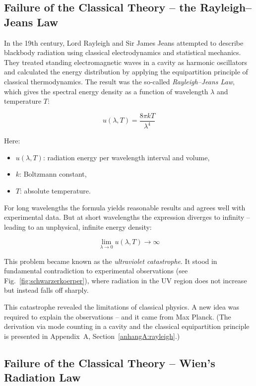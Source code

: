 \subsection{Failure of the Classical Theory – \newline the Rayleigh–Jeans Law}

In the 19th century, Lord Rayleigh and Sir James Jeans attempted to describe blackbody radiation using classical electrodynamics and statistical mechanics. They treated standing electromagnetic waves in a cavity as harmonic oscillators and calculated the energy distribution by applying the equipartition principle of classical thermodynamics.
\newpage
\noindent
The result was the so-called \emph{Rayleigh–Jeans Law}, which gives the spectral energy density as a function of wavelength \( \lambda \) and temperature \( T \):

\[
u(\lambda, T) = \frac{8 \pi k T}{\lambda^4}
\]

Here:
\begin{itemize}
	\item \( u(\lambda, T) \): radiation energy per wavelength interval and volume,
	\item \( k \): Boltzmann constant,
	\item \( T \): absolute temperature.
\end{itemize}

For long wavelengths the formula yields reasonable results and agrees well with experimental data. But at short wavelengths the expression diverges to infinity – leading to an unphysical, infinite energy density:

\[
\lim_{\lambda \to 0} u(\lambda, T) \to \infty
\]

This problem became known as the \emph{ultraviolet catastrophe}. It stood in fundamental contradiction to experimental observations (see Fig.~\ref{fig:schwarzerkoerper}), where radiation in the UV region does not increase but instead falls off sharply.

This catastrophe revealed the limitations of classical physics. A new idea was required to explain the observations – and it came from Max Planck.  
(The derivation via mode counting in a cavity and the classical equipartition principle is presented in Appendix~A, Section~\ref{anhangA:rayleigh}.)
\subsection{Failure of the Classical Theory – \newline Wien’s Radiation Law}


